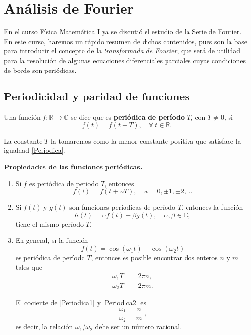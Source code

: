 \chapter{Análisis de Fourier}

En el curso Física Matemática I ya se discutió el estudio de la Serie de Fourier. En este curso, haremos un rápido resumen de dichos contenidos, pues son la base para introducir el concepto de la \emph{transformada de Fourier}, que será de utilidad para la resolución de algunas ecuaciones diferenciales parciales cuyas condiciones de borde son periódicas.

\section{Periodicidad y paridad de funciones}


\begin{defi} 
Una función $f: \mathbb{R} \to \mathbb{C} $ se dice que es \textbf{periódica de período} $T$, con $T\neq 0$, si 
\begin{equation} \label{Periodica}
    \boxed{
f(t) = f(t + T), \quad \forall \ t \in \mathbb{R}.}    
\end{equation}



La constante $T$ la tomaremos como la  menor constante positiva que satisface la igualdad \eqref{Periodica}.
\end{defi}


\begin{propiedad} 
    \textbf{Propiedades de las funciones periódicas.}
    \begin{enumerate}
        \item Si $f$ es periódica de periodo $T$, entonces $$f(t) = f(t + nT), \quad n = 0, \pm 1, \pm 2, \dots$$
        
        \item Si $f(t)$ y $g(t)$ son funciones periódicas de período $T$, entonces la función
        $$h(t) = \alpha f(t) + \beta g(t); \quad \alpha, \beta \in \mathbb{C},$$
        tiene el mismo período $T$.
    
        \item En general, si la función 
        $$f(t) = \cos (\omega_1 t) + \cos (\omega_2 t)$$
        es periódica de período $T$, entonces es posible encontrar dos enteros $n$ y $m$ tales que 
        \begin{align}
            \omega_1 T &= 2\pi n,  \label{Periodica1}\\
             \omega_2 T &= 2\pi m. \label{Periodica2}
        \end{align}
        
        El cociente de \eqref{Periodica1} y \eqref{Periodica2} es
        $$\frac{\omega_1}{\omega_2} = \frac{n}{m} \ ,$$
        es decir, la relación $\omega_1/ \omega_2$ debe ser un número racional.
    \end{enumerate}
\end{propiedad}


